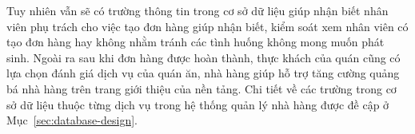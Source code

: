 Tuy nhiên vẫn sẽ có trường thông tin trong cơ sở dữ liệu giúp nhận biết nhân viên phụ trách cho việc tạo đơn hàng giúp nhận biết, kiểm soát xem nhân viên có tạo đơn hàng hay không nhằm tránh các tình huống không mong muốn phát sinh.
Ngoài ra sau khi đơn hàng được hoàn thành, thực khách của quán cũng có lựa chọn đánh giá dịch vụ của quán ăn, nhà hàng giúp hỗ trợ tăng cường quảng bá nhà hàng trên trang giới thiệu của nền tảng.
Chi tiết về các trường trong cơ sở dữ liệu thuộc từng dịch vụ trong hệ thống quản lý nhà hàng được đề cập ở Mục~\ref{sec:database-design}.

    

    
